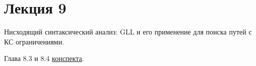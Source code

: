 \section{Лекция 9}

Нисходящий синтаксический анализ: GLL и его применение для поиска путей с КС ограничениями.


Глава 8.3 и 8.4 \href{https://github.com/YaccConstructor/articles/blob/master/InProgress/Formal_langs_CFPQ_course_notes/Formal_lang_CFPQ_course_notes.pdf}{конспекта}.
